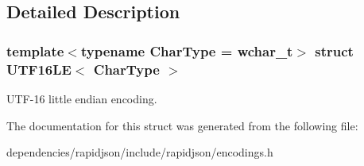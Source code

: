 \subsection{Detailed Description}
\subsubsection*{template$<$typename Char\+Type = wchar\+\_\+t$>$\newline
struct U\+T\+F16\+L\+E$<$ Char\+Type $>$}

U\+T\+F-\/16 little endian encoding. 

The documentation for this struct was generated from the following file\+:\begin{DoxyCompactItemize}
\item 
dependencies/rapidjson/include/rapidjson/encodings.\+h\end{DoxyCompactItemize}
